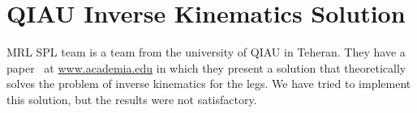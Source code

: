 \section{QIAU Inverse Kinematics Solution}
MRL SPL team is a team from the university of QIAU in Teheran. They have a paper~\cite{iran} at \url{www.academia.edu} in which they present a solution that theoretically solves the problem of inverse kinematics for the legs. We have tried to implement this solution, but the results were not satisfactory.